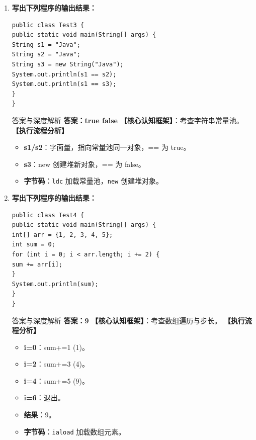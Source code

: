 \documentclass[12pt, a4paper]{ctexart}
\newcommand{\code}[1]{\texttt{\color{myblue}#1}}
\begin{document}
\begin{enumerate}[label=\arabic*.]
\item \textbf{写出下列程序的输出结果：}
\begin{lstlisting}
public class Test3 {
public static void main(String[] args) {
String s1 = "Java";
String s2 = "Java";
String s3 = new String("Java");
System.out.println(s1 == s2);
System.out.println(s1 == s3);
}
}
\end{lstlisting}
\begin{bluebox}{答案与深度解析}
\textbf{答案：true false}
\textbf{【核心认知框架】}：考查字符串常量池。
\textbf{【执行流程分析】}
\begin{itemize}[leftmargin=*, nosep]
    \item \textbf{s1/s2}：字面量，指向常量池同一对象，== 为 true。
    \item \textbf{s3}：new 创建堆新对象，== 为 false。
    \item \textbf{字节码}：\code{ldc} 加载常量池，\code{new} 创建堆对象。
\end{itemize}
\end{bluebox}

\item \textbf{写出下列程序的输出结果：}
\begin{lstlisting}
public class Test4 {
public static void main(String[] args) {
int[] arr = {1, 2, 3, 4, 5};
int sum = 0;
for (int i = 0; i < arr.length; i += 2) {
sum += arr[i];
}
System.out.println(sum);
}
}
\end{lstlisting}
\begin{bluebox}{答案与深度解析}
\textbf{答案：9}
\textbf{【核心认知框架】}：考查数组遍历与步长。
\textbf{【执行流程分析】}
\begin{itemize}[leftmargin=*, nosep]
    \item \textbf{i=0}：sum+=1 (1)。
    \item \textbf{i=2}：sum+=3 (4)。
    \item \textbf{i=4}：sum+=5 (9)。
    \item \textbf{i=6}：退出。
    \item \textbf{结果}：9。
    \item \textbf{字节码}：\code{iaload} 加载数组元素。
\end{itemize}
\end{bluebox}


\end{enumerate}
\end{document}
